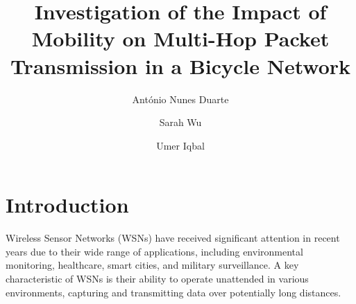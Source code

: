 \documentclass[runningheads]{llncs}
\begin{document}
%
\title{Investigation of the Impact of Mobility on Multi-Hop Packet Transmission in a Bicycle Network}
%
%
\author{António Nunes Duarte \and
Sarah Wu \and
Umer Iqbal} %
%
%
%

\maketitle              %
%


\section{Introduction}

Wireless Sensor Networks (WSNs) have received significant attention in recent years due to their wide range of applications, including environmental monitoring, healthcare, smart cities, and military surveillance. A key characteristic of WSNs is their ability to operate unattended in various environments, capturing and transmitting data over potentially long distances.
\end{document}
